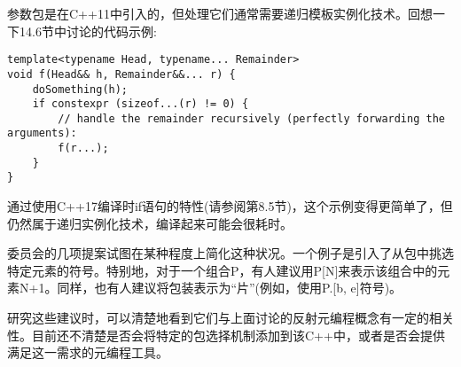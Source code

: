 参数包是在C++11中引入的，但处理它们通常需要递归模板实例化技术。回想一下14.6节中讨论的代码示例:

\begin{lstlisting}[style=styleCXX]
template<typename Head, typename... Remainder>
void f(Head&& h, Remainder&&... r) {
	doSomething(h);
	if constexpr (sizeof...(r) != 0) {
		// handle the remainder recursively (perfectly forwarding the arguments):
		f(r...);
	}
}
\end{lstlisting}

通过使用C++17编译时if语句的特性(请参阅第8.5节)，这个示例变得更简单了，但仍然属于递归实例化技术，编译起来可能会很耗时。

委员会的几项提案试图在某种程度上简化这种状况。一个例子是引入了从包中挑选特定元素的符号。特别地，对于一个组合P，有人建议用P[N]来表示该组合中的元素N+1。同样，也有人建议将包装表示为“片”(例如，使用P.[b, e]符号)。

研究这些建议时，可以清楚地看到它们与上面讨论的反射元编程概念有一定的相关性。目前还不清楚是否会将特定的包选择机制添加到该C++中，或者是否会提供满足这一需求的元编程工具。




















































